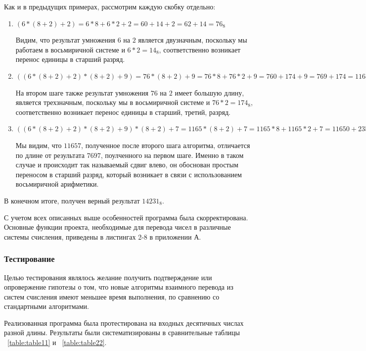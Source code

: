 \documentclass[14pt, russian]{scrartcl}
\begin{document}
Как и в предыдущих примерах, рассмотрим каждую скобку отдельно:
\begin{enumerate}
    \item $(6*(8+2) + 2) = 6 * 8 + 6 * 2 + 2 = 60 + 14 + 2 = 62 + 14 = 76_8$
    
    Видим, что результат умножения $6$ на $2$ является двузначным, поскольку мы работаем в восьмиричной системе и $6 * 2 = 14_8$, соответственно возникает перенос единицы в старший разряд.
    \item $((6*(8+2) + 2)*(8+2) +9) = 76 *(8+2) + 9 = 76 * 8 + 76 * 2 + 9 = 760 + 174 + 9 =  769 + 174 = 1165_8$
    
    На втором шаге также результат умножения $76$ на $2$ имеет большую длину, является трехзначным, поскольку мы в восьмиричной системе и $76 * 2 = 174_8$, соответственно возникает перенос единицы в старший, третий, разряд.
    \item $((6*(8+2) + 2)*(8+2) +9)*(8+2) + 7 = 1165 * (8 + 2) + 7 = 1165 * 8 + 1165 * 2 + 7 = 11650 + 2352 + 7 =  11657 + 2352 = 14231_8$
    
    Мы видим, что $11657$, полученное после второго шага алгоритма, отличается по длине от результата $7697$, поулченного на первом шаге. Именно в таком случае и происходит так называемый сдвиг влево, он обоснован простым переносом в старший разряд, который возникает в связи с использованием восьмиричной арифметики.
\end{enumerate}
\vspace{0.2em}
В конечном итоге, получен верный результат $14231_8$.

С учетом всех описанных выше особенностей программа была скорректирована. Основные функции проекта, необходимые для перевода чисел в различные системы счисления, приведены в листингах 2-8 в приложении А.


\subsubsection{Тестирование}
Целью тестирования являлось желание получить подтверждение или опровержение гипотезы о том, что новые алгоритмы взаимного перевода из систем счисления имеют меньшее время выполнения, по сравнению со стандартными алгоритмами.

Реализованная программа была протестирована на входных десятичных числах разной длины. Результаты были систематизированы в сравнительные таблицы ~\ref{table:table11} и ~\ref{table:table22}.
\end{document}
